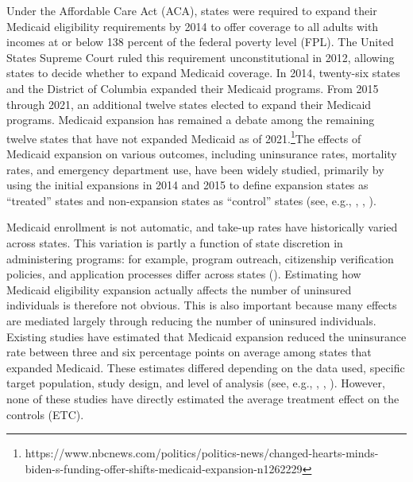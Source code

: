 \documentclass[aoas]{imsart}
\theoremstyle{plain}
\theoremstyle{remark}
\begin{document}
Under the Affordable Care Act (ACA), states were required to expand their Medicaid eligibility requirements by 2014 to offer coverage to all adults with incomes at or below 138 percent of the federal poverty level (FPL). The United States Supreme Court ruled this requirement unconstitutional in 2012, allowing states to decide whether to expand Medicaid coverage. In 2014, twenty-six states and the District of Columbia expanded their Medicaid programs. From 2015 through 2021, an additional twelve states elected to expand their Medicaid programs. Medicaid expansion has remained a debate among the remaining twelve states that have not expanded Medicaid as of 2021.\footnote{https://www.nbcnews.com/politics/politics-news/changed-hearts-minds-biden-s-funding-offer-shifts-medicaid-expansion-n1262229}The effects of Medicaid expansion on various outcomes, including uninsurance rates, mortality rates, and emergency department use, have been widely studied, primarily by using the initial expansions in 2014 and 2015 to define expansion states as ``treated'' states and non-expansion states as ``control'' states (see, e.g., \cite{courtemanche2017early}, \cite{wherry2016early}, \cite{ladhania2021effect}).

Medicaid enrollment is not automatic, and take-up rates have historically varied across states. This variation is partly a function of state discretion in administering programs: for example, program outreach, citizenship verification policies, and application processes differ across states (\cite{courtemanche2017early}). Estimating how Medicaid eligibility expansion actually affects the number of uninsured individuals is therefore not obvious. This is also important because many effects are mediated largely through reducing the number of uninsured individuals. Existing studies have estimated that Medicaid expansion reduced the uninsurance rate between three and six percentage points on average among states that expanded Medicaid. These estimates differed depending on the data used, specific target population, study design, and level of analysis (see, e.g., \cite{kaestner2017effects}, \cite{courtemanche2017early}, \cite{frean2017premium}). However, none of these studies have directly estimated the average treatment effect on the controls (ETC). 
\end{document}
